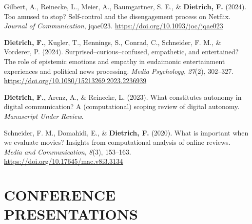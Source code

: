 \documentclass[11pt,a4paper,]{awesome-cv}
\newlength{\cslhangindent}
\newenvironment{CSLReferences}[2] %
 {\begin{list}{}{%
  \setlength{\itemindent}{0pt}
  \setlength{\leftmargin}{0pt}
  \setlength{\parsep}{0pt}
  \ifodd #1
   \setlength{\leftmargin}{\cslhangindent}
   \setlength{\itemindent}{-1\cslhangindent}
  \fi
  \setlength{\itemsep}{#2\baselineskip}}}
 {\end{list}}
\begin{document}
\label{refs-365d51d03b11fb701183a4999e6e9a62}
\begin{CSLReferences}{1}{0}
Gilbert, A., Reinecke, L., Meier, A., Baumgartner, S. E., \&
\textbf{Dietrich, F.} (2024). Too amused to stop? Self-control and the
disengagement process on Netflix. \emph{Journal of Communication},
jqae023. \url{https://doi.org/10.1093/joc/jqae023}

\textbf{Dietrich, F.}, Kugler, T., Hennings, S., Conrad, C., Schneider,
F. M., \& Vorderer, P. (2024). Surprised--curious--confused, empathetic,
and entertained? The role of epistemic emotions and empathy in
eudaimonic entertainment experiences and political news processing.
\emph{Media Psychology}, \emph{27}(2), 302--327.
\url{https://doi.org/10.1080/15213269.2023.2236939}

\textbf{Dietrich, F.}, Arenz, A., \& Reinecke, L. (2023). What
constitutes autonomy in digital communication? A (computational) scoping
review of digital autonomy. \emph{Manuscript Under Review}.

Schneider, F. M., Domahidi, E., \& \textbf{Dietrich, F.} (2020). What is
important when we evaluate movies? Insights from computational analysis
of online reviews. \emph{Media and Communication}, \emph{8}(3),
153--163. \url{https://doi.org/10.17645/mac.v8i3.3134}

\end{CSLReferences}

\endgroup

\section{CONFERENCE PRESENTATIONS}\label{conference-presentations}

\begingroup
\vspace{0.6em}
\fontsize{9pt}{1em}\bodyfontlight{}\color{text}
\setlength{\parindent}{-0.5in}
\setlength{\leftskip}{0.5in}
\end{document}
